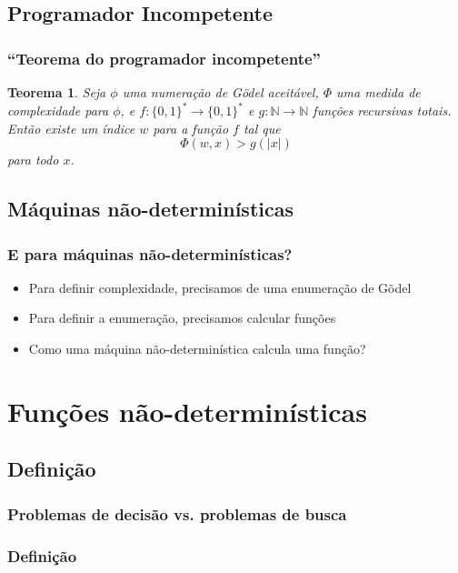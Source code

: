 \documentclass[utf8,notheorems]{beamer}
\newtheorem*{theorem}{Teorema}
\theoremstyle{definition}
\begin{document}
\subsection{Programador Incompetente}
\begin{frame}
    \frametitle{``Teorema do programador incompetente''}
    \begin{theorem}
        Seja $\phi$ uma numeração de Gödel aceitável,
        $\Phi$ uma medida de complexidade para $\phi$,
        e $f: \{0, 1\}^* \to \{0, 1\}^*$ e $g: \mathbb N \to \mathbb N$
        funções recursivas totais.
        Então existe um índice $w$ para a função $f$ tal que
        \begin{equation*}
            \Phi(w, x) > g(|x|)
        \end{equation*}
        para todo $x$.
    \end{theorem}
\end{frame}

\subsection{Máquinas não-determinísticas}
\begin{frame}
    \frametitle{E para máquinas não-determinísticas?}

    \begin{itemize}
        \item Para definir complexidade, precisamos de uma enumeração de Gõdel
        \item Para definir a enumeração, precisamos calcular funções
        \item Como uma máquina não-determinística calcula uma função?
    \end{itemize}
\end{frame}

\section{Funções não-determinísticas}

\subsection{Definição}
\begin{frame}
    \frametitle{Problemas de decisão vs. problemas de busca}
\end{frame}
\begin{frame}
    \frametitle{Definição}
\end{frame}
\end{document}
